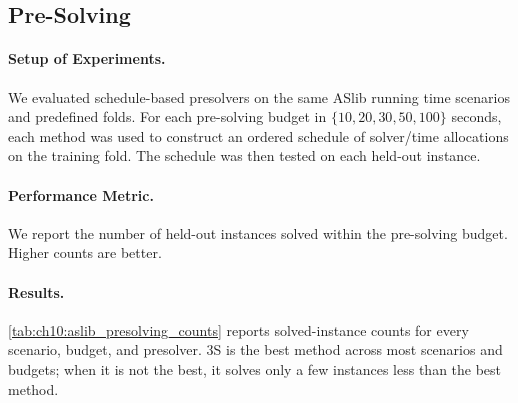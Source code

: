 \clearpage

\subsection{Pre-Solving}

\paragraph{Setup of Experiments.}
We evaluated schedule-based presolvers on the same ASlib running time scenarios and predefined folds. For each pre-solving budget in $\{10,20,30,50,100\}$ seconds, each method was used to construct an ordered schedule of solver/time allocations on the training fold. The schedule was then tested on each held-out instance.

\paragraph{Performance Metric.} We report the number of held-out instances solved within the pre-solving budget. Higher counts are better.

\paragraph{Results.}
\cref{tab:ch10:aslib_presolving_counts} reports solved-instance counts for every scenario, budget, and presolver. 3S is the best method across most scenarios and budgets; when it is not the best, it solves only a few instances less than the best method.

